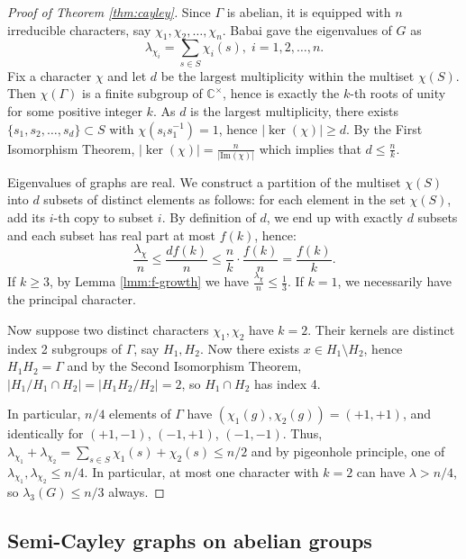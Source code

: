 \documentclass[12pt]{article}
\begin{document}
\begin{proof}[Proof of Theorem \ref{thm:cayley}]
    Since $\Gamma$ is abelian, it is equipped with $n$ irreducible characters, say $\chi_1, \chi_2, \dots, \chi_n$. Babai \cite{BabaiCayleySpectra} gave the eigenvalues of $G$ as
    \[\lambda_{\chi_i} = \sum_{s \in S} \chi_i(s), \; i = 1, 2, \dots, n.\]
    Fix a character $\chi$ and let $d$ be the largest multiplicity within the multiset $\chi(S)$. Then $\chi(\Gamma)$ is a finite subgroup of $\mathbb{C}^\times$, hence is exactly the $k$-th roots of unity for some positive integer $k$. As $d$ is the largest multiplicity, there exists $\{s_1, s_2, \dots, s_d\} \subset S$ with $\chi(s_is_1^{-1}) = 1$, hence $|\ker(\chi)| \ge d$. By the First Isomorphism Theorem, $|\ker(\chi)| = \frac{n}{|\text{Im}(\chi)|}$ which implies that $d \le \frac{n}{k}$. 

    Eigenvalues of graphs are real. We construct a partition of the multiset $\chi(S)$ into $d$ subsets of distinct elements as follows: for each element in the set $\chi(S)$, add its $i$-th copy to subset $i$. By definition of $d$, we end up with exactly $d$ subsets and each subset has real part at most $f(k)$, hence:
    \[\frac{\lambda_\chi}{n} \le \frac{df(k)}{n} \le \frac{n}{k} \cdot \frac{f(k)}{n} = \frac{f(k)}{k}.\]
    If $k \ge 3$, by Lemma \ref{lmm:f-growth} we have $\frac{\lambda_\chi}{n} \le \frac13$. If $k = 1$, we necessarily have the principal character. 
    
    Now suppose two distinct characters $\chi_1, \chi_2$ have $k = 2$. Their kernels are distinct index 2 subgroups of $\Gamma$, say $H_1, H_2$. Now there exists $x \in H_1 \setminus H_2$, hence $H_1H_2 = \Gamma$ and by the Second Isomorphism Theorem, $|H_1/H_1 \cap H_2| = |H_1H_2/H_2| = 2$, so $H_1 \cap H_2$ has index 4. 

    In particular, $n/4$ elements of $\Gamma$ have $(\chi_1(g), \chi_2(g)) = (+1, +1)$, and identically for $(+1,-1)$, $(-1,+1)$, $(-1,-1)$. Thus, $\lambda_{\chi_1} + \lambda_{\chi_2} = \sum_{s \in S} \chi_1(s) + \chi_2(s) \le n/2$ and by pigeonhole principle, one of $\lambda_{\chi_1}, \lambda_{\chi_2} \le n/4$. In particular, at most one character with $k = 2$ can have $\lambda > n/4$, so $\lambda_3(G) \le n/3$ always. 
\end{proof}

\subsection{Semi-Cayley graphs on abelian groups}
\end{document}
